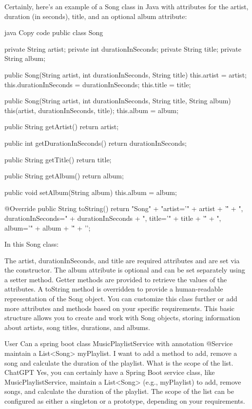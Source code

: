 Certainly, here's an example of a Song class in Java with attributes for the artist, duration (in seconds), title, and an optional album attribute:

java
Copy code
public class Song {
    private String artist;
    private int durationInSeconds;
    private String title;
    private String album;

    public Song(String artist, int durationInSeconds, String title) {
        this.artist = artist;
        this.durationInSeconds = durationInSeconds;
        this.title = title;
    }

    public Song(String artist, int durationInSeconds, String title, String album) {
        this(artist, durationInSeconds, title);
        this.album = album;
    }

    public String getArtist() {
        return artist;
    }

    public int getDurationInSeconds() {
        return durationInSeconds;
    }

    public String getTitle() {
        return title;
    }

    public String getAlbum() {
        return album;
    }

    public void setAlbum(String album) {
        this.album = album;
    }

    @Override
    public String toString() {
        return "Song{" +
                "artist='" + artist + '\'' +
                ", durationInSeconds=" + durationInSeconds +
                ", title='" + title + '\'' +
                ", album='" + album + '\'' +
                '}';
    }
}
In this Song class:

The artist, durationInSeconds, and title are required attributes and are set via the constructor.
The album attribute is optional and can be set separately using a setter method.
Getter methods are provided to retrieve the values of the attributes.
A toString method is overridden to provide a human-readable representation of the Song object.
You can customize this class further or add more attributes and methods based on your specific requirements. This basic structure allows you to create and work with Song objects, storing information about artists, song titles, durations, and albums.




User
Can a spring boot class MusicPlaylistService with annotation @Service maintain a List<Song> myPlaylist. I want to add a method to add, remove a song and calculate the duration of the playlist. What is the scope of the list.
ChatGPT
Yes, you can certainly have a Spring Boot service class, like MusicPlaylistService, maintain a List<Song> (e.g., myPlaylist) to add, remove songs, and calculate the duration of the playlist. The scope of the list can be configured as either a singleton or a prototype, depending on your requirements.

